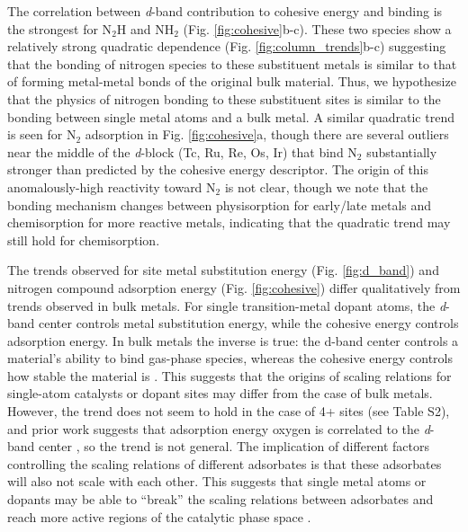 The correlation between \textit{d}-band contribution to cohesive energy and binding is the strongest for N$_2$H and NH$_2$ (Fig. \ref{fig:cohesive}b-c). These two species show a relatively strong quadratic dependence (Fig. \ref{fig:column_trends}b-c) suggesting that the bonding of nitrogen species to these substituent metals is similar to that of forming metal-metal bonds of the original bulk material. Thus, we hypothesize that the physics of nitrogen bonding to these substituent sites is similar to the bonding between single metal atoms and a bulk metal.
A similar quadratic trend is seen for N$_2$ adsorption in Fig. \ref{fig:cohesive}a, though there are several outliers near the middle of the \textit{d}-block (Tc, Ru, Re, Os, Ir) that bind N$_2$ substantially stronger than predicted by the cohesive energy descriptor. The origin of this anomalously-high reactivity toward N$_2$ is not clear, though we note that the bonding mechanism changes between physisorption for early/late metals and chemisorption for more reactive metals, indicating that the quadratic trend may still hold for chemisorption.

The trends observed for site metal substitution energy (Fig. \ref{fig:d_band}) and nitrogen compound adsorption energy (Fig. \ref{fig:cohesive}) differ qualitatively from trends observed in bulk metals. For single transition-metal dopant atoms, the \textit{d}-band center controls metal substitution energy, while the cohesive energy controls adsorption energy. In bulk metals the inverse is true: the d-band center controls a material's ability to bind gas-phase species, whereas the cohesive energy controls how stable the material is \cite{Hammer_1995}. This suggests that the origins of scaling relations for single-atom catalysts or dopant sites may differ from the case of bulk metals. However, the trend does not seem to hold in the case of 4+ sites (see Table S2), and prior work suggests that adsorption energy oxygen is correlated to the \textit{d}-band center \cite{Hammer_2000}, so the trend is not general. The implication of different factors controlling the scaling relations of different adsorbates is that these adsorbates will also not scale with each other. This suggests that single metal atoms or dopants may be able to ``break'' the scaling relations between adsorbates and reach more active regions of the catalytic phase space \cite{Gani_2018, Darby_2018}.


